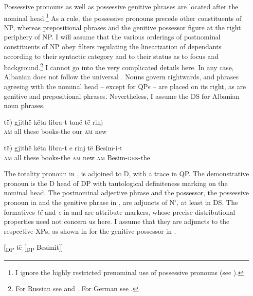 \documentclass[output=paper,colorlinks,citecolor=brown]{langscibook}
\begin{document}
Possessive pronouns as well as possessive genitive phrases are located after the nominal head.\footnote{I ignore the highly restricted prenominal use of possessive pronouns (see \citealt[284f., 411f.]{Buchholz87Albanische-grammatik}).} As a rule, the possessive pronouns precede other constituents of NP, whereas prepositional phrases and the genitive possessor figure at the right periphery of NP. I will assume that the various orderings of postnominal constituents of NP obey filters regulating the linearization of dependants according to their syntactic category and to their status as to focus and background.\footnote{For Russian see \citet{Huste89Zur-Syntax, Huste89Zur-Topologie} and \citet{Bischof91Sachverhaltsbezeichnungen-des}. For German see \citet{Freytag90Die-syntaktische, Freytag91Sachverhaltsbezeichnungen-des}.} I cannot go into the very complicated details here. In any case, Albanian does not follow the universal . Nouns govern rightwards, and phrases agreeing with the nominal head -- except for QPs -- are placed on its right, as are genitive and prepositional phrases. Nevertheless, I assume the DS  for Albanian noun phrases.

\ea \label{ex:zi91:45}
    \gll \minsp{(} të) gjithë këta libra-t tanë të rinj \\
    {} \textsc{am} all these books-the our \textsc{am} new \\
    \glt 

\ex \label{ex:zi91:46}
    \gll \minsp{(} të) gjithë këta libra-t e rinj të Besim-i-t \\
    {} \textsc{am} all these books-the \textsc{am} new \textsc{am} Besim-\textsc{gen}-the \\
    \glt
\z

\noindent The totality pronoun in ,  is adjoined to D, with a trace in QP. The demonstrative pronoun is the D head of DP with tautological definiteness marking on the nominal head. The postnominal adjective phrase and the possessor, the possessive pronoun in  and the genitive phrase in , are adjuncts of N$'$, at least in DS. The formatives \textit{të} and \textit{e} in  and  are attribute markers, whose precise distributional properties need not concern us here. I assume that they are adjuncts to the respective XPs, as shown in  for the genitive possessor in .

\ea \label{ex:zi91:47} $[$\textsubscript{DP} të [\textsubscript{DP} Besimit]]
\z
\end{document}
